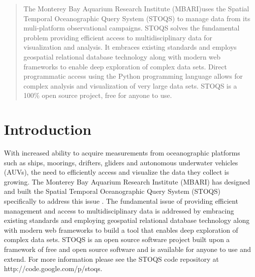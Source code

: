 \documentclass[conference]{IEEEtran}
\begin{document}
\begin{abstract}

The Monterey Bay Aquarium Research Institute (MBARI)uses the Spatial Temporal Oceanographic Query System (STOQS) to manage data from its muli-platform observational campaigns. STOQS solves the fundamental problem providing efficient access to multidisciplinary data for visualization and analysis. It embraces existing standards and employs geospatial relational database technology along with modern web frameworks to enable deep exploration of complex data sets. Direct programmatic access using the Python programming language allows for complex analysis and visualization of very large data sets. STOQS is a 100\% open source project, free for anyone to use.

\end{abstract}





%
\IEEEpeerreviewmaketitle


\section{Introduction}

With increased ability to acquire measurements from oceanographic platforms such as ships, moorings, drifters, gliders and autonomous underwater vehicles (AUVs), the need to efficiently access and visualize the data they collect is growing. The Monterey Bay Aquarium Research Institute (MBARI) has designed and built the Spatial Temporal Oceanographic Query System (STOQS) specifically to address this issue \cite{imdis2013}. The fundamental issue of providing efficient management and access to multidisciplinary data is addressed by embracing existing standards and employing geospatial relational database technology along with modern web frameworks to build a tool that enables deep exploration of complex data sets. STOQS is an open source software project built upon a framework of free and open source software and is available for anyone to use and extend. For more information please see the STOQS code repository at http://code.google.com/p/stoqs.
\end{document}
